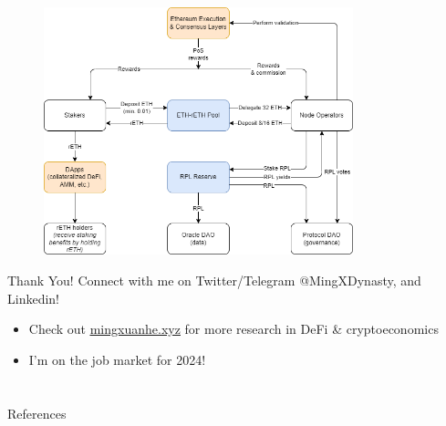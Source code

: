 \documentclass{beamer}
\begin{document}
\begin{frame}
    \begin{figure}
        \centering
        \includegraphics[width=0.8\textwidth]{figures/Rocketpool tokenomics.png}
    \end{figure}
\end{frame}

\begin{frame}{Thank You!}
    Connect with me on Twitter/Telegram @MingXDynasty, and Linkedin!\\ 
    \bigskip
    \begin{itemize}
        \item Check out \href{https://www.mingxuanhe.xyz/}{\underline{mingxuanhe.xyz}} for more research in DeFi \& cryptoeconomics
        \item I'm on the job market for 2024!
 
    \end{itemize}
   

\end{frame}

\section*{}

\begin{frame}[allowframebreaks]{References}
    \nocite{*}
    \printbibliography
\end{frame}
\end{document}
